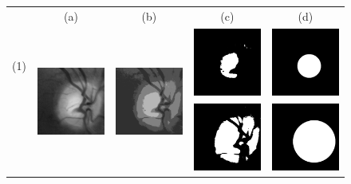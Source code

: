 \begin{figure}[h]

    \centering
    \renewcommand{\arraystretch}{2}
    
    \begin{tabular}{c c c c c}
        
        {} & {(a)} & {(b)} & {(c)} & {(d)} \\
        {} & {} & {} & \multirow{2}{*}{\includegraphics[width=2.5cm]{Images/Results/Segmentation/drishti98/2_cup.png}} & 
        \multirow{2}{*}{\includegraphics[width=2.5cm]{Images/Results/Segmentation/drishti98/6_hough_cup.png}} \\
        
        {(1)} & \multirow{2}{*}{\includegraphics[width=2.5cm]{Images/Results/Segmentation/drishti98/0_crop.png}} & 
        \multirow{2}{*}{\includegraphics[width=2.5cm]{Images/Results/Segmentation/drishti98/1_kmeans.png}} & {} & {} \\
        
        {} & {} & {} & \multirow{2}{*}{\includegraphics[width=2.5cm]{Images/Results/Segmentation/drishti98/3_do.png}} & 
        \multirow{2}{*}{\includegraphics[width=2.5cm]{Images/Results/Segmentation/drishti98/7_hough_do.png}} \\
        

\end{tabular}
\end{figure}
